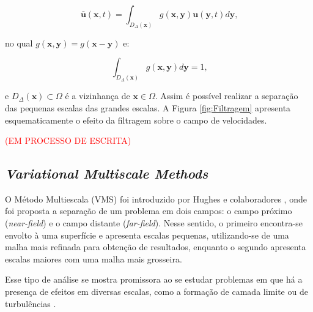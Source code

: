 \documentclass[_ArquivoPrincipal.tex]{subfiles}
\begin{document}
\begin{equation}
    \bar{\mathbf{u}}(\mathbf{x},t)=\int_{D_\Delta(\mathbf{x})}{g(\mathbf{x},\mathbf{y})\mathbf{u}(\mathbf{y},t)d\mathbf{y}}\text{,}
    \label{Filtro1}
\end{equation}

\noindent no qual $g(\mathbf{x},\mathbf{y})=g(\mathbf{x}-\mathbf{y})$ e:

\begin{equation}
    \int_{D_\Delta(\mathbf{x})}{g(\mathbf{x},\mathbf{y})d\mathbf{y}}=1\text{,}
    \label{Filtro2}
\end{equation}

\noindent e $D_\Delta(\mathbf{x})\subset\Omega$ é a vizinhança de $\mathbf{x}\in\Omega$. Assim é possível realizar a separação das pequenas escalas das grandes escalas. A Figura \ref{fig:Filtragem} apresenta esquematicamente o efeito da filtragem sobre o campo de velocidades.


\textcolor{red}{(EM PROCESSO DE ESCRITA)}
\subsection{\textit{Variational Multiscale Methods}} \label{VMS}

O Método Multiescala (VMS) foi introduzido por Hughes e colaboradores \cite{hughes1995multiscale, hughes1996space, hughes1998variational}, onde foi proposta a separação de um problema em dois campos: o campo próximo (\textit{near-field}) e o campo distante (\textit{far-field}). Nesse sentido, o primeiro encontra-se envolto à uma superfície e apresenta escalas pequenas, utilizando-se de uma malha mais refinada para obtenção de resultados, enquanto o segundo apresenta escalas maiores com uma malha mais grosseira.

Esse tipo de análise se mostra promissora ao se estudar problemas em que há a presença de efeitos em diversas escalas, como a formação de camada limite ou de turbulências \cite{fernandes2020tecnica}.
\end{document}
